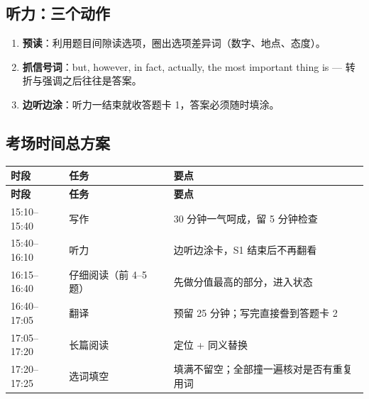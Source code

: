 \subsection{听力：三个动作}

\begin{enumerate}
  \item \textbf{预读}：利用题目间隙读选项，圈出选项差异词（数字、地点、态度）。
  \item \textbf{抓信号词}：but, however, in fact, actually, the most important thing is --- 转折与强调之后往往是答案。
  \item \textbf{边听边涂}：听力一结束就收答题卡 1，答案必须随时填涂。
\end{enumerate}

\subsection{考场时间总方案}

\begin{center}
\small
\begin{longtable}{p{3.0cm}p{5.2cm}p{6.4cm}}
\toprule
\textbf{时段} & \textbf{任务} & \textbf{要点} \\
\midrule
\endfirsthead
\toprule
\textbf{时段} & \textbf{任务} & \textbf{要点} \\
\midrule
\endhead
15:10--15:40 & 写作 & 30 分钟一气呵成，留 5 分钟检查 \\
\midrule
15:40--16:10 & 听力 & 边听边涂卡，S1 结束后不再翻看 \\
\midrule
16:15--16:40 & 仔细阅读（前 4--5 题） & 先做分值最高的部分，进入状态 \\
\midrule
16:40--17:05 & 翻译 & 预留 25 分钟；写完直接誊到答题卡 2 \\
\midrule
17:05--17:20 & 长篇阅读 & 定位 + 同义替换 \\
\midrule
17:20--17:25 & 选词填空 & 填满不留空；全部撞一遍核对是否有重复用词 \\
\bottomrule
\end{longtable}
\end{center}
